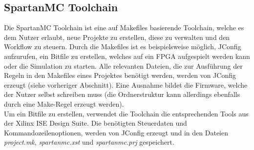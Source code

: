 \subsection{SpartanMC Toolchain}
Die SpartanMC Toolchain ist eine auf Makefiles basierende Toolchain, welche es dem Nutzer erlaubt, neue Projekte zu erstellen, diese zu
verwalten und den Workflow zu steuern. Durch die Makefiles ist es beispielsweise möglich, JConfig aufzurufen, ein Bitfile zu erstellen, welches
auf ein FPGA aufgespielt werden kann oder die Simulation zu starten. Alle relevanten Dateien, die zur Ausführung der Regeln in den Makefiles eines Projektes benötigt 
werden, werden von JConfig erzeugt (siehe vorheriger Abschnitt). Eine Ausnahme bildet die Firmware, welche der Nutzer selbst schreiben muss (die
Ordnerstruktur kann allerdings ebenfalls durch eine Make-Regel erzeugt werden).\\
Um ein Bitfile zu erstellen, verwendet die Toolchain die entsprechenden Tools aus der Xilinx ISE Design Suite. Die benötigten Steuerdaten und Kommandozeilenoptionen,
werden von JConfig erzeugt und in den Dateien \textit{project.mk}, \textit{spartanmc.xst} und \textit{spartanmc.prj} gespeichert.

